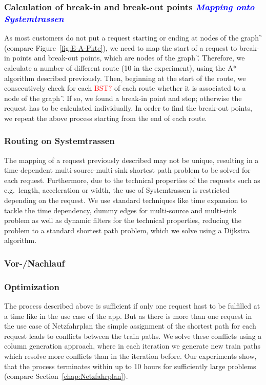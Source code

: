 \subsubsection{Calculation of break-in and break-out points \emph{\textcolor{blue}{Mapping onto Systemtrassen}}}
As most customers do not put a request starting or ending at nodes of the graph \G\, (compare Figure~\ref{fig:E-A-Pkte}), we need to map the start of a request to break-in points and break-out points, which are nodes of the graph \G. Therefore, we calculate a number of different route (10 in the experiment), using the A* algorithm described previously. Then, beginning at the start of the route, we consecutively check for each \textcolor{red}{BST?} of each route whether it is associated to a node of the graph \G. If so, we found a break-in point and stop; otherwise the request has to be calculated individually. In order to find the break-out points, we repeat the above process starting from the end of each route.

\subsubsection{Routing on Systemtrassen}
The mapping of a request previously described may not be unique, resulting in a time-dependent multi-source-multi-sink shortest path problem to be solved for each request. Furthermore, due to the technical properties of the requests such as e.g.\ length, acceleration or width, the use of Systemtrassen is restricted depending on the request.
We use standard techniques like time expansion to tackle the time dependency, dummy edges for multi-source and multi-sink problem as well as dynamic filters for the technical properties, reducing the problem to a standard shortest path problem, which we solve using a Dijkstra algorithm.

\subsubsection{Vor-/Nachlauf}

\subsubsection{Optimization}
The process described above is sufficient if only one request hast to be fulfilled at a time like in the use case of the app. But as there is more than one request in the use case of Netzfahrplan the simple assignment of the shortest path for each request leads to conflicts between the train paths. We solve these conflicts using a column generation approach, where in each iteration we generate new train paths which resolve more conflicts than in the iteration before. Our experiments show, that the process terminates within up to 10 hours for sufficiently large problems (compare Section~\ref{chap:Netzfahrplan}).